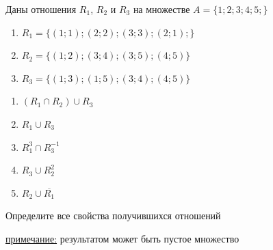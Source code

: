 \question
Даны отношения $R_1$, $R_2$ и $R_3$ на множестве $A = \{1; 2; 3; 4; 5;\}$ 
\begin{enumerate}
	\renewcommand{\labelenumi}{\alph{enumi})}
	\item $R_1 = \{(1; 1); (2; 2); (3; 3); (2; 1);\}$
	\item $R_2 = \{(1; 2); (3; 4); (3; 5); (4; 5)\}$
	\item $R_3 = \{(1; 3); (1; 5); (3; 4); (4; 5)\}$
\end{enumerate}

\begin{enumerate}
	\renewcommand{\labelenumi}{\alph{enumi})}
	\item $(R_1 \cap R_2) \cup R_3$
	\item $R_1 \cup R_3$
	\item $R_1^3 \cap R_3^{-1}$
	\item $R_3 \cup R_2^2$
	\item $R_2 \cup \overline{R_1}$
\end{enumerate}

Определите все свойства получившихся отношений

\underline{примечание:} результатом может быть пустое множество